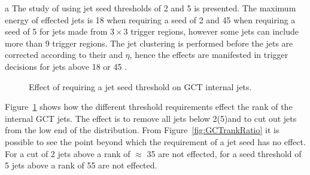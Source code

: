a
The study of using jet seed thresholds of 2 and 5 \GeV is presented. The maximum energy of effected jets is 18 \GeV when 
requiring a seed of 2 \GeV and 45 \GeV when requiring a seed of 5 \GeV for jets made from $3\times3$ trigger regions, however 
some jets can include more than 9 trigger regions. The jet clustering is performed before the \Lone jets are corrected according 
to their \ET and $\eta$, hence the effects are manifested in trigger decisions for \Lone jets above 18 or 45 \GeV.



\begin{figure}[h!]
    \centering
    \caption{Effect of requiring a jet seed threshold on GCT internal jets.}
    \label{fig:GCTrank}
\end{figure}


Figure~\ref{fig:GCTrank} shows how the different threshold requirements effect the rank of the internal GCT jets.
The effect is to remove all jets below 2(5)\GeV and to cut out jets from the low end of the distribution. 
From Figure~\ref{fig:GCTrankRatio} it is possible to see the point beyond which the requirement of a jet seed has no effect. 
For a cut of 2 \GeV jets above a rank of $\approx$ 35 are not effected, for a seed threshold of 5 \GeV jets above a 
rank of 55 are not effected.



